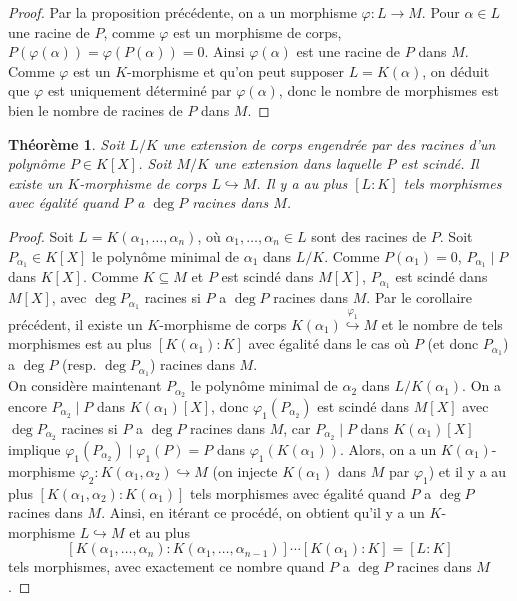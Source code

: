 \documentclass{article}
\theoremstyle{plain}
\newtheorem{theorem}{Théorème}[section]
\theoremstyle{definition}
\theoremstyle{remark}
\begin{document}
\begin{proof}
    Par la proposition précédente, on a un morphisme $\varphi : L \to M$. Pour $\alpha \in L$ une racine de $P$, comme $\varphi$ est un morphisme de corps, $P(\varphi(\alpha)) = \varphi(P(\alpha)) = 0$. Ainsi $\varphi(\alpha)$ est une racine de $P$ dans $M$. Comme $\varphi$ est un $K$-morphisme et qu'on peut supposer $L=K(\alpha)$, on déduit que $\varphi$ est uniquement déterminé par $\varphi(\alpha)$, donc le nombre de morphismes est bien le nombre de racines de $P$ dans $M$.
\end{proof}

\begin{theorem}
    Soit $L/K$ une extension de corps engendrée par des racines d'un polynôme $P \in K[X]$. Soit $M/K$ une extension dans laquelle $P$ est scindé. Il existe un $K$-morphisme de corps $L \hookrightarrow M$. Il y a au plus $[L : K]$ tels morphismes avec égalité quand $P$ a $\deg P$ racines dans $M$.
\end{theorem}

\begin{proof}
    Soit $L=K(\alpha_1,\dots,\alpha_n)$, où $\alpha_1,\dots,\alpha_n \in L$ sont des racines de $P$. Soit $P_{\alpha_1} \in K[X]$ le polynôme minimal de $\alpha_1$ dans $L/K$. Comme $P(\alpha_1) = 0$, $P_{\alpha_1} \mid P$ dans $K[X]$. Comme $K \subseteq M$ et $P$ est scindé dans $M[X]$, $P_{\alpha_1}$ est scindé dans $M[X]$, avec $\deg P_{\alpha_1}$ racines si $P$ a $\deg P$ racines dans $M$. Par le corollaire précédent, il existe un $K$-morphisme de corps $K(\alpha_1) \overset{\varphi_1}{\hookrightarrow} M$ et le nombre de tels morphismes est au plus $[K(\alpha_1) : K]$ avec égalité dans le cas où $P$ (et donc $P_{\alpha_1}$) a $\deg P$ (resp. $\deg P_{\alpha_1}$) racines dans $M$. \\
    On considère maintenant $P_{\alpha_2}$ le polynôme minimal de $\alpha_2$ dans $L/K(\alpha_1)$. On a encore $P_{\alpha_2} \mid P$ dans $K(\alpha_1)[X]$, donc $\varphi_1 (P_{\alpha_2})$ est scindé dans $M[X]$ avec $\deg P_{\alpha_2}$ racines si $P$ a $\deg P$ racines dans $M$, car $P_{\alpha_2} \mid P$ dans $K(\alpha_1)[X]$ implique $\varphi_1(P_{\alpha_2}) \mid \varphi_1(P) = P$ dans $\varphi_1 (K(\alpha_1))$. Alors, on a un $K(\alpha_1)$-morphisme $\varphi_2 : K(\alpha_1, \alpha_2) \hookrightarrow M$ (on injecte $K(\alpha_1)$ dans $M$ par $\varphi_1$) et il y a au plus $[K(\alpha_1, \alpha_2) : K(\alpha_1)]$ tels morphismes avec égalité quand $P$ a $\deg P$ racines dans $M$. Ainsi, en itérant ce procédé, on obtient qu'il y a un $K$-morphisme $L \hookrightarrow M$ et au plus
    \[[K(\alpha_1,\dots,\alpha_n) : K(\alpha_1,\dots,\alpha_{n-1})] \cdots [K(\alpha_1) : K] = [L : K]\]
    tels morphismes, avec exactement ce nombre quand $P$ a $\deg P$ racines dans $M$.
\end{proof}
\end{document}
